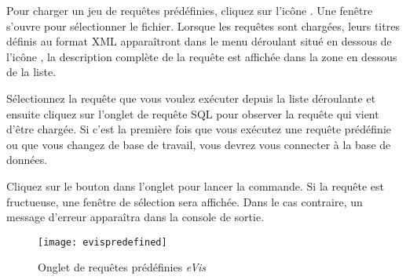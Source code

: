 Pour charger un jeu de requêtes prédéfinies, cliquez sur l'icône . Une fenêtre s'ouvre pour sélectionner le fichier. Lorsque les requêtes sont chargées, leurs titres définis au format XML apparaîtront dans le menu déroulant situé en dessous de l'icône , la description complète de la requête est affichée dans la zone en dessous de la liste.


Sélectionnez la requête que vous voulez exécuter depuis la liste déroulante et ensuite cliquez sur l'onglet de requête SQL pour observer la requête qui vient d'être chargée. Si c'est la première fois que vous exécutez une requête prédéfinie ou que vous changez de base de travail, vous devrez vous connecter à la base de données.


Cliquez sur le bouton  dans l'onglet  pour lancer la commande. Si la requête est fructueuse, une fenêtre de sélection sera affichée. Dans le cas contraire, un message d'erreur apparaîtra dans la console de sortie.


\begin{figure}[htp]
   \begin{center}
\caption{\label{evispredefined}Onglet de requêtes prédéfinies \emph{eVis} \nixcaption}
\texttt{[image: evispredefined]}
\end{center}
\end{figure}

